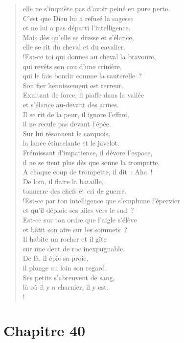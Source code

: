 \documentclass[french,twoside]{book} %
\newcommand\chapteropen{} %
\newcommand\chapterclose{} %
\begin{document}
\begin{verse}
elle ne s’inquiète pas d’avoir peiné en pure perte.\\
C’est que Dieu lui a refusé la sagesse \\
et ne lui a pas départi l’intelligence.\\
Mais dès qu’elle se dresse et s’élance, \\
elle se rit du cheval et du cavalier.\\!Est-ce toi qui donnes au cheval la bravoure, \\
qui revêts son cou d’une crinière,\\
qui le fais bondir comme la sauterelle ? \\
Son fier hennissement est terreur.\\
Exultant de force, il piaffe dans la vallée \\
et s’élance au-devant des armes.\\
Il se rit de la peur, il ignore l’effroi, \\
il ne recule pas devant l’épée.\\
Sur lui résonnent le carquois, \\
la lance étincelante et le javelot.\\
Frémissant d’impatience, il dévore l’espace, \\
il ne se tient plus dès que sonne la trompette.\\
A chaque coup de trompette, il dit : Aha ! \\
De loin, il flaire la bataille, \\
tonnerre des chefs et cri de guerre.\\!Est-ce par ton intelligence que s’emplume l’épervier \\
et qu’il déploie ses ailes vers le sud ?\\
Est-ce sur ton ordre que l’aigle s’élève \\
et bâtit son aire sur les sommets ?\\
Il habite un rocher et il gîte \\
sur une dent de roc inexpugnable.\\
De là, il épie sa proie, \\
il plonge au loin son regard.\\
Ses petits s’abreuvent de sang, \\
là où il y a charnier, il y est.\\!
\end{verse}
\chapterclose


\chapteropen
\chapter[{Chapitre 40}]{Chapitre 40}\renewcommand{\leftmark}{Chapitre 40}
\end{document}
